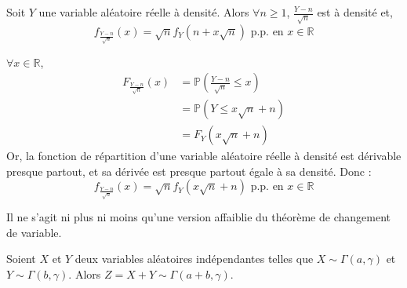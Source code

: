 




	\begin{lemma}
		\label{formule-stirling-1}
		Soit $Y$ une variable aléatoire réelle à densité. Alors $\forall n \geq 1$, $\frac{Y - n}{\sqrt{n}}$ est à densité et,
		\[ f_{\frac{Y - n}{\sqrt{n}}}(x) = \sqrt{n} f_{Y}(n + x \sqrt{n}) \text{ p.p. en } x \in \mathbb{R} \]
	\end{lemma}

	\begin{demonstration}
		$\forall x \in \mathbb{R}$,
		\begin{align*}
			F_{\frac{Y - n}{\sqrt{n}}}(x) & = \mathbb{P} \left(\frac{Y - n}{\sqrt{n}} \leq x \right) \\
			&= \mathbb{P} (Y \leq x \sqrt{n} + n) \\
			&= F_Y (x \sqrt{n} + n)
		\end{align*}
		Or, la fonction de répartition d'une variable aléatoire réelle à densité est dérivable presque partout, et sa dérivée est presque partout égale à sa densité. Donc :
		\[ f_{\frac{Y - n}{\sqrt{n}}}(x) = \sqrt{n} f_Y (x \sqrt{n} + n) \text{ p.p. en } x \in \mathbb{R} \]
	\end{demonstration}

	\begin{remark}
		Il ne s'agit ni plus ni moins qu'une version affaiblie du théorème de changement de variable.
	\end{remark}


	\begin{lemma}
		\label{formule-stirling-2}
		Soient $X$ et $Y$ deux variables aléatoires indépendantes telles que $X \sim \Gamma(a, \gamma)$ et $Y \sim \Gamma(b, \gamma)$. Alors $Z = X + Y \sim \Gamma(a+b, \gamma)$.
	\end{lemma}

